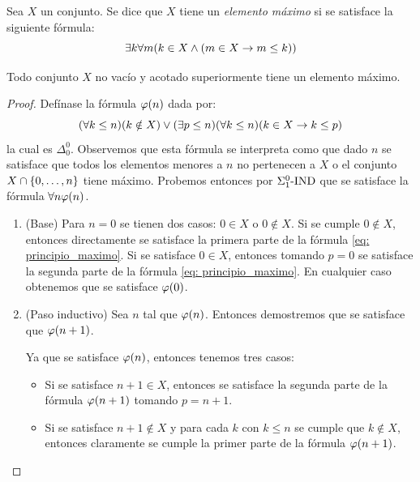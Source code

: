 \begin{definition}[Máximo]
	Sea $X$ un conjunto. Se dice que $X$ tiene un \emph{elemento máximo} si se satisface la siguiente fórmula:
	\[
		\exists k\forall m\pa*{k\in X\land\pa*{m\in X\to m\leq k}}
	\]
\end{definition}

\begin{theorem}
	Todo conjunto $X$ no vacío y acotado superiormente tiene un elemento máximo.
\end{theorem}

\begin{proof}
	Defínase la fórmula $\varphi\pa*{n}$ dada por:
	\begin{equation}
		\label{eq: principio_maximo}
		\pa*{\forall k\leq n}\pa*{k\notin X}\lor\pa*{\exists p\leq n}\pa*{\forall k\leq n}\pa*{k\in X\to k\leq p}
	\end{equation}
	la cual es $\Delta_{0}^{0}$. Observemos que esta fórmula se interpreta como que dado $n$ se satisface que todos los elementos menores a $n$ no pertenecen a $X$ o el conjunto $X\cap\{0,\dotsc, n\}$ tiene máximo. Probemos entonces por $\Sigma_{1}^{0}\text{-}\mathrm{IND}$ que se satisface la fórmula $\forall n\varphi\pa*{n}$.

	\begin{enumerate}
		\item (Base) Para $n = 0$ se tienen dos casos: $0\in X$ o $0\notin X$. Si se cumple $0\notin X$, entonces directamente se satisface la primera parte de la fórmula \eqref{eq: principio_maximo}. Si se satisface $0\in X$, entonces tomando $p = 0$ se satisface la segunda parte de la fórmula \eqref{eq: principio_maximo}. En cualquier caso obtenemos que se satisface $\varphi\pa*{0}$.

		\item (Paso inductivo) Sea $n$ tal que $\varphi\pa*{n}$. Entonces demostremos que se satisface que $\varphi\pa*{n + 1}$.

		Ya que se satisface $\varphi\pa*{n}$, entonces tenemos tres casos:

		\begin{itemize}
			\item Si se satisface $n + 1\in X$, entonces se satisface la segunda parte de la fórmula $\varphi\pa*{n + 1}$ tomando $p = n + 1$.

			\item Si se satisface $n + 1\notin X$ y para cada $k$ con $k\leq n$ se cumple que $k\notin X$, entonces claramente se cumple la primer parte de la fórmula $\varphi\pa*{n + 1}$.


\end{itemize}
\end{enumerate}
\end{proof}

